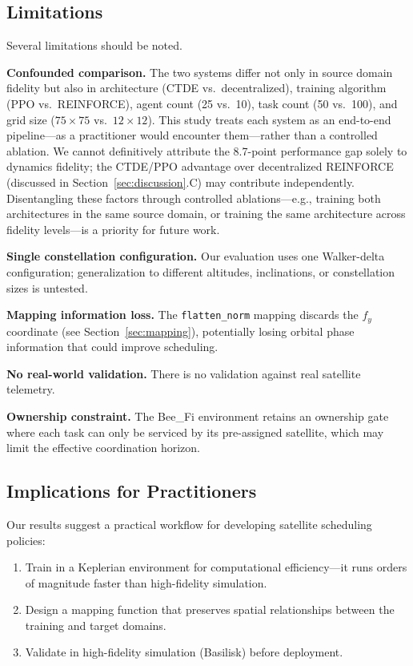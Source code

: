 \documentclass[conference]{IEEEtran}
\begin{document}
\subsection{Limitations}

Several limitations should be noted.

\textbf{Confounded comparison.} The two systems differ not only in source domain fidelity but also in architecture (CTDE vs.\ decentralized), training algorithm (PPO vs.\ REINFORCE), agent count (25 vs.\ 10), task count (50 vs.\ 100), and grid size ($75 \times 75$ vs.\ $12 \times 12$). This study treats each system as an end-to-end pipeline---as a practitioner would encounter them---rather than a controlled ablation. We cannot definitively attribute the 8.7-point performance gap solely to dynamics fidelity; the CTDE/PPO advantage over decentralized REINFORCE (discussed in Section~\ref{sec:discussion}.C) may contribute independently. Disentangling these factors through controlled ablations---e.g., training both architectures in the same source domain, or training the same architecture across fidelity levels---is a priority for future work.

\textbf{Single constellation configuration.} Our evaluation uses one Walker-delta configuration; generalization to different altitudes, inclinations, or constellation sizes is untested.

\textbf{Mapping information loss.} The \texttt{flatten\_norm} mapping discards the $f_y$ coordinate (see Section~\ref{sec:mapping}), potentially losing orbital phase information that could improve scheduling.

\textbf{No real-world validation.} There is no validation against real satellite telemetry.

\textbf{Ownership constraint.} The Bee\_Fi environment retains an ownership gate where each task can only be serviced by its pre-assigned satellite, which may limit the effective coordination horizon.

\subsection{Implications for Practitioners}

Our results suggest a practical workflow for developing satellite scheduling policies:
\begin{enumerate}
    \item Train in a Keplerian environment for computational efficiency---it runs orders of magnitude faster than high-fidelity simulation.
    \item Design a mapping function that preserves spatial relationships between the training and target domains.
    \item Validate in high-fidelity simulation (Basilisk) before deployment.
\end{enumerate}
\end{document}
